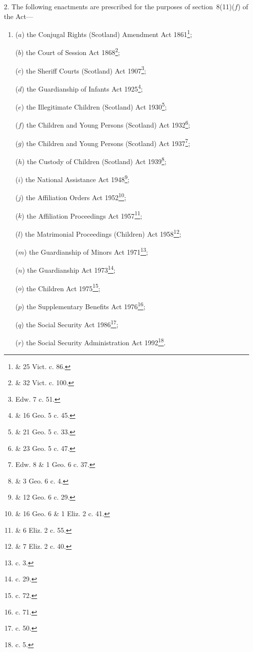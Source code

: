 \documentclass[12pt,a4paper]{article}
\begin{document}
2.  The following enactments are prescribed for the purposes of section~8(11)($f$) of the Act—
\begin{enumerate}\item[]
($a$) the Conjugal Rights (Scotland) Amendment Act 1861\footnote{ \& 25 Vict. c. 86.};

($b$) the Court of Session Act 1868\footnote{ \& 32 Vict. c. 100.};

($c$) the Sheriff Courts (Scotland) Act 1907\footnote{ Edw. 7 c. 51.};

($d$) the Guardianship of Infants Act 1925\footnote{ \& 16 Geo. 5 c. 45.};

($e$) the Illegitimate Children (Scotland) Act 1930\footnote{ \& 21 Geo. 5 c. 33.};

($f$) the Children and Young Persons (Scotland) Act 1932\footnote{ \& 23 Geo. 5 c. 47.};

($g$) the Children and Young Persons (Scotland) Act 1937\footnote{ Edw. 8 \& 1 Geo. 6 c. 37.};

($h$) the Custody of Children (Scotland) Act 1939\footnote{ \& 3 Geo. 6 c. 4.};

($i$) the National Assistance Act 1948\footnote{ \& 12 Geo. 6 c. 29.};

($j$) the Affiliation Orders Act 1952\footnote{ \& 16 Geo. 6 \& 1 Eliz. 2 c. 41.};

($k$) the Affiliation Proceedings Act 1957\footnote{ \& 6 Eliz. 2 c. 55.};

($l$) the Matrimonial Proceedings (Children) Act 1958\footnote{ \& 7 Eliz. 2 c. 40.};

($m$) the Guardianship of Minors Act 1971\footnote{ c. 3.};

($n$) the Guardianship Act 1973\footnote{ c. 29.};

($o$) the Children Act 1975\footnote{ c. 72.};

($p$) the Supplementary Benefits Act 1976\footnote{ c. 71.};

($q$) the Social Security Act 1986\footnote{ c. 50.};

($r$) the Social Security Administration Act 1992\footnote{ c. 5.}.
\end{enumerate}
\end{document}

